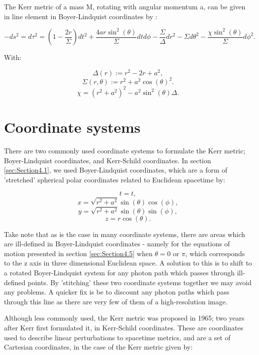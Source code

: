 \documentclass[oneside,openright,frontopenright, singlespacing]{dmathesis}
\begin{document}
\vspace{1em}
	The Kerr metric of a mass M, rotating with angular momentum a, can be given in line element in Boyer-Lindquist coordinates by \cite{boyer1967maximal}:

	\[-ds^2=d\tau^{2} = \left(1-\frac{2r}{\Sigma}\right)dt^2+\frac{4ar\sin^2(\theta)}{\Sigma}dtd\phi-\frac{\Sigma}{\Delta}dr^2-{\Sigma}d\theta^2-\frac{\chi\sin^2(\theta)}{\Sigma}d\phi^2.\]

\vspace{1em}
	With:
	
	\[\Delta(r) := r^2 - 2r + a^2,\]
	\[\Sigma(r, \theta) := r^2 + a^2\cos(\theta)^2.\]
	\[\chi = (r^2+a^2)^2-a^2\sin^2(\theta)\Delta.\]

\section{Coordinate systems}\label{sec:Section4.2}

	There are two commonly used coordinate systems to formulate the Kerr metric; Boyer-Lindquist coordinates\cite{boyer1967maximal}, and Kerr-Schild coordinates\cite{debney1969solutions}. In section \ref{sec:Section4.1}, we used Boyer-Lindquist coordinates, which are a form of 'stretched' spherical polar coordinates related to Euclidean spacetime by:

	\[t=t,\]
	\[x = \sqrt{r^2+a^2}\sin(\theta)\cos(\phi),\]
	\[y = \sqrt{r^2+a^2}\sin(\theta)\sin(\phi),\]
	\[z = r\cos(\theta).\]

\vspace{1em}
	Take note that as is the case in many coordinate systems, there are areas which are ill-defined in Boyer-Lindquist coordinates - namely for the equations of motion presented in section \ref{sec:Section4.5} when $\theta = 0\mbox{ or }\pi$, which corresponds to the z axis in three dimensional Euclidean space. A solution to this is to shift to a rotated Boyer-Lindquist system for any photon path which passes through ill-defined points. By 'stitching' these two coordinate systems together we may avoid any problems. A quicker fix is be to discount any photon paths which pass through this line as there are very few of them of a high-resolution image.

\vspace{1em}
	Although less commonly used, the Kerr metric was proposed in 1965; two years after Kerr first formulated it, in Kerr-Schild coordinates. These are coordinates used to describe linear perturbations to spacetime metrics, and are a set of Cartesian coordinates, in the case of the Kerr metric given by:
\end{document}
